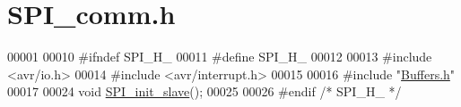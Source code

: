 \hypertarget{_s_p_i__comm_8h_source}{}\section{S\+P\+I\+\_\+comm.\+h}
\label{_s_p_i__comm_8h_source}

\begin{DoxyCode}
00001 
00010 \textcolor{preprocessor}{#ifndef SPI\_H\_}
00011 \textcolor{preprocessor}{#define SPI\_H\_}
00012 
00013 \textcolor{preprocessor}{#include <avr/io.h>}
00014 \textcolor{preprocessor}{#include <avr/interrupt.h>}
00015 
00016 \textcolor{preprocessor}{#include "\hyperlink{_buffers_8h}{Buffers.h}"}
00017 
00024 \textcolor{keywordtype}{void} \hyperlink{_s_p_i__comm_8h_a9208b9a00dfa335b5dd56360ea5c7813}{SPI\_init\_slave}();
00025 
00026 \textcolor{preprocessor}{#endif }\textcolor{comment}{/* SPI\_H\_ */}\textcolor{preprocessor}{}
\end{DoxyCode}
